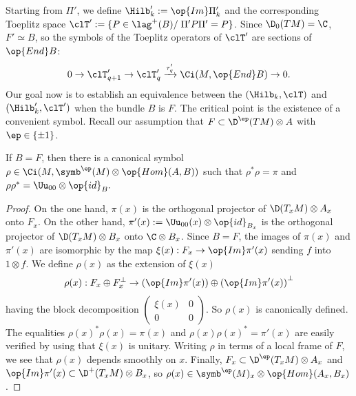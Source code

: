 Starting from $\Pi'$, we define $\Hilb_k' := \op{Im} \Pi'_k$ and the corresponding Toeplitz space $\clT' := \{ P
\in \lag^{+} (B)/ \; \Pi' P \Pi' = P \}$. Since $\D_0(TM) = \C$, $F' \simeq B$, so the symbols of the Toeplitz operators of $\clT'$ are sections of $\op{End} B$:
\[
0 \rightarrow \clT'_{q+1} \rightarrow \clT'_q
\xrightarrow{\tau'_q} \Ci (M, \op{End} B) \rightarrow 0.
\]
Our goal now is to establish an equivalence between the $(\Hilb_k, \clT)$ and $(\Hilb_k', \clT')$ when the bundle $B$ is $F$. The critical point is the existence of a convenient symbol. Recall our assumption that $F \subset
\D ^{\ep} (TM) \otimes A$ with $\ep \in \{ \pm 1 \}$.

\begin{lemm}\label{lem:unitary-symbole}
If $B = F$, then there is a canonical symbol $\rho \in \Ci (M, \symb^{\ep} (M) \otimes \op{Hom} (A, B))$ such that $ \rho^* \rho = \pi $ and $\rho \rho ^* = \Uu_{00} \otimes \op{id}_{B}.$
\end{lemm}

\begin{proof}
On the one hand, $\pi (x) $ is the
orthogonal projector of $\D (T_xM) \otimes A_x$ onto $F_x$. On the other hand, $\pi'(x) := \Uu_{00} (x) \otimes \op{id}_{B_x}$ is the orthogonal projector of $\D (T_xM) \otimes B_x$ onto $\C \otimes B_x$. Since $B = F$, the images of $\pi (x)$ and $\pi'(x)$ are isomorphic by the map $ \xi (x) : F_x \rightarrow \op{Im} \pi '(x)$ sending $f$ into $1
\otimes f$. We define $\rho (x)$ as the extension of $\xi(x)$
\begin{gather}\label{eq:def_rho}
\rho (x) : F_x \oplus F_x^{\perp} \rightarrow \left(\op{Im} \pi'(x)\right) \oplus \left(\op{Im} \pi'(x)\right)^{\perp}
\end{gather}
having the block decomposition $
(\begin{smallmatrix} \xi (x) & 0 \\ 0 & 0
\end{smallmatrix})$. So $\rho (x)$ is canonically defined. The equalities $ \rho(x)^* \rho(x) = \pi (x) $ and $\rho(x) \rho(x) ^* = \pi '(x)$ are easily verified by using that $\xi (x)$ is unitary. Writing $\rho $ in terms of a local frame of $F$, we see that $\rho (x)$ depends smoothly on $x$. Finally, $F_x \subset \D^{\ep} (T_xM)\otimes A_x$ and $\op{Im} \pi'(x) \subset \D^{+} (T_x M) \otimes B_x$, so $\rho (x) \in \symb^{\ep} (M)_x \otimes \op{Hom} (A_x, B_x)$.
\end{proof}

